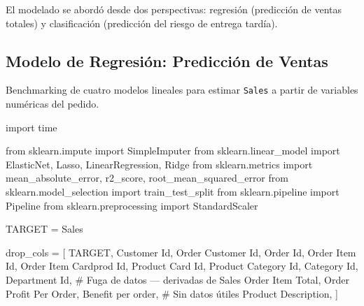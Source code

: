 \documentclass[
  letterpaper,
  DIV=11,
  numbers=noendperiod]{scrartcl}
\newenvironment{Shaded}{\begin{snugshade}}{\end{snugshade}}
\newcommand{\CommentTok}[1]{\textcolor[rgb]{0.37,0.37,0.37}{#1}}
\newcommand{\ImportTok}[1]{\textcolor[rgb]{0.00,0.46,0.62}{#1}}
\newcommand{\NormalTok}[1]{\textcolor[rgb]{0.00,0.23,0.31}{#1}}
\newcommand{\OperatorTok}[1]{\textcolor[rgb]{0.37,0.37,0.37}{#1}}
\newcommand{\StringTok}[1]{\textcolor[rgb]{0.13,0.47,0.30}{#1}}
\begin{document}
El modelado se abordó desde dos perspectivas: regresión (predicción de
ventas totales) y clasificación (predicción del riesgo de entrega
tardía).

\subsection{Modelo de Regresión: Predicción de
Ventas}\label{modelo-de-regresiuxf3n-predicciuxf3n-de-ventas}

Benchmarking de cuatro modelos lineales para estimar \texttt{Sales} a
partir de variables numéricas del pedido.

\begin{Shaded}
\begin{Highlighting}[]
\ImportTok{import}\NormalTok{ time}

\ImportTok{from}\NormalTok{ sklearn.impute }\ImportTok{import}\NormalTok{ SimpleImputer}
\ImportTok{from}\NormalTok{ sklearn.linear\_model }\ImportTok{import}\NormalTok{ ElasticNet, Lasso, LinearRegression, Ridge}
\ImportTok{from}\NormalTok{ sklearn.metrics }\ImportTok{import}\NormalTok{ mean\_absolute\_error, r2\_score, root\_mean\_squared\_error}
\ImportTok{from}\NormalTok{ sklearn.model\_selection }\ImportTok{import}\NormalTok{ train\_test\_split}
\ImportTok{from}\NormalTok{ sklearn.pipeline }\ImportTok{import}\NormalTok{ Pipeline}
\ImportTok{from}\NormalTok{ sklearn.preprocessing }\ImportTok{import}\NormalTok{ StandardScaler}

\NormalTok{TARGET }\OperatorTok{=} \StringTok{\textquotesingle{}Sales\textquotesingle{}}

\NormalTok{drop\_cols }\OperatorTok{=}\NormalTok{ [}
\NormalTok{    TARGET,}
    \StringTok{\textquotesingle{}Customer Id\textquotesingle{}}\NormalTok{, }\StringTok{\textquotesingle{}Order Customer Id\textquotesingle{}}\NormalTok{, }\StringTok{\textquotesingle{}Order Id\textquotesingle{}}\NormalTok{,}
    \StringTok{\textquotesingle{}Order Item Id\textquotesingle{}}\NormalTok{, }\StringTok{\textquotesingle{}Order Item Cardprod Id\textquotesingle{}}\NormalTok{,}
    \StringTok{\textquotesingle{}Product Card Id\textquotesingle{}}\NormalTok{, }\StringTok{\textquotesingle{}Product Category Id\textquotesingle{}}\NormalTok{, }\StringTok{\textquotesingle{}Category Id\textquotesingle{}}\NormalTok{, }\StringTok{\textquotesingle{}Department Id\textquotesingle{}}\NormalTok{,}
    \CommentTok{\# Fuga de datos — derivadas de Sales}
    \StringTok{\textquotesingle{}Order Item Total\textquotesingle{}}\NormalTok{,}
    \StringTok{\textquotesingle{}Order Profit Per Order\textquotesingle{}}\NormalTok{,}
    \StringTok{\textquotesingle{}Benefit per order\textquotesingle{}}\NormalTok{,}
    \CommentTok{\# Sin datos útiles}
    \StringTok{\textquotesingle{}Product Description\textquotesingle{}}\NormalTok{,}
\NormalTok{]}


\end{Highlighting}
\end{Shaded}
\end{document}
